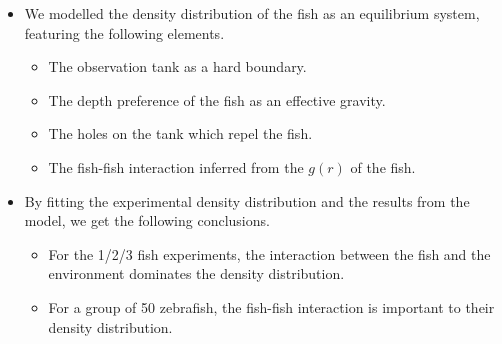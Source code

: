 \documentclass[11pt,twoside]{report}
\begin{document}
\vfill
\newpage

\begin{adjustwidth}{0cm}{-5cm}
\begin{tcolorbox}[
title=Summary of Chapter~6,
fonttitle=\sffamily\Large,
right=0.1\linewidth,
enlarge bottom by=0.5em,
enlarge top by=0.5em,
]
\begin{itemize}
	\item We modelled the density distribution of the fish as an equilibrium system, featuring the following elements.

	\begin{itemize}
		\item The observation tank as a hard boundary.
		\item The depth preference of the fish as an effective gravity.
		\item The holes on the tank which repel the fish.
		\item The fish-fish interaction inferred from the $g(r)$ of the fish.
	\end{itemize}

	\item By fitting the experimental density distribution and the results from the model, we get the following conclusions.
	\begin{itemize}
		\item For the 1/2/3 fish experiments, the interaction between the fish and the environment dominates the density distribution.
		\item For a group of 50 zebrafish, the fish-fish interaction is important to their density distribution.
	\end{itemize}
	

\end{itemize}
\end{tcolorbox}
\end{adjustwidth}
\end{document}
